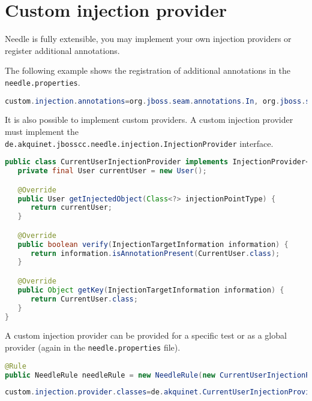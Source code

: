 \section{Custom injection provider}
\label{sec:Custom injection provider}

Needle is fully extensible, you may implement your own injection providers or register additional annotations.

The following example shows the registration of additional annotations in the \verb|needle.properties|.

\begin{lstlisting}[language={JAVA},caption=Additional Annotation]
custom.injection.annotations=org.jboss.seam.annotations.In, org.jboss.seam.annotations.Logger
\end{lstlisting}

It is also possible to implement custom providers.
A custom injection provider must implement the \verb|de.akquinet.jbosscc.needle.injection.InjectionProvider| interface.

\begin{lstlisting}[language={JAVA},caption=javax.inject.Qualifier Injection Provider]
public class CurrentUserInjectionProvider implements InjectionProvider<User> {
   private final User currentUser = new User();

   @Override
   public User getInjectedObject(Class<?> injectionPointType) {
      return currentUser;
   }

   @Override
   public boolean verify(InjectionTargetInformation information) {
      return information.isAnnotationPresent(CurrentUser.class);
   }

   @Override
   public Object getKey(InjectionTargetInformation information) {
      return CurrentUser.class;
   }
}
\end{lstlisting}

A custom injection provider can be provided for a specific test or as a global provider (again in the \verb|needle.properties| file).

\begin{lstlisting}[language={JAVA},caption=Custom injection provider for a specific test]
@Rule
public NeedleRule needleRule = new NeedleRule(new CurrentUserInjectionProvider());
\end{lstlisting}

\begin{lstlisting}[language={JAVA},caption=Global custom injection provider]
custom.injection.provider.classes=de.akquinet.CurrentUserInjectionProvider
\end{lstlisting}

